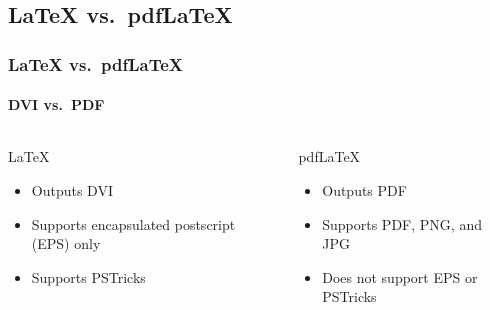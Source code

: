 \documentclass[article]{beamer}
\begin{document}
\subsection{\LaTeX{} vs.\ pdf\LaTeX{}}
\begin{frame}
  \frametitle{\LaTeX{} vs.\ pdf\LaTeX}
  \framesubtitle{DVI vs.\ PDF}
  
  \begin{columns}
    \begin{column}{0.5\textwidth}
      \begin{center}
      \Large{\LaTeX}
    \end{center}
      \begin{itemize}%
        \item Outputs DVI
        \item Supports encapsulated postscript (EPS) only
        \item Supports PSTricks
      \end{itemize}
      
    \end{column}
    \begin{column}{0.5\textwidth}
      \begin{center}
        \Large{pdf\LaTeX}
    \end{center}
    \begin{itemize}%
      \item Outputs PDF
      \item Supports PDF, PNG, and JPG
      \item Does not support EPS or PSTricks
    \end{itemize}
    \end{column}
  \end{columns}
\end{frame}
\end{document}
